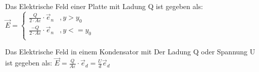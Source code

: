 \beginbsp
Das Elektrische Feld einer Platte mit Ladung Q ist gegeben als:
\formulaBegin
$\vec{E} = \begin{cases}
\frac{Q}{2\cdot A \varepsilon} \cdot \vec{e}_n & , y > y_0 \\
\frac{-Q}{2\cdot A \varepsilon} \cdot \vec{e}_n & , y <= y_0 \\

\end{cases}
$
\formulaEnd
\begin{center}
\end{center}
\iend



\beginbsp
Das Elektrische Feld in einem Kondensator mit Der Ladung Q oder Spannung U ist gegeben als:
\formulaBegin
$\vec{E} = \frac{Q}{A\varepsilon} \cdot \vec{e}_d = \frac{U}{d	} \vec{e}_d$
\formulaEnd
\begin{center}
\end{center}
\iend



